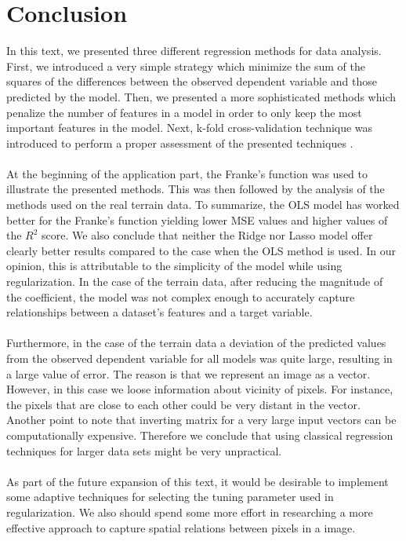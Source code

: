 \documentclass [11pt]{article}
\begin{document}
\section*{Conclusion}
In this text, we presented three different regression methods for data analysis. First, we introduced a very simple strategy which minimize the sum of the squares of the differences between the observed dependent variable and those predicted by the model. Then, we presented a more sophisticated methods which penalize the number of features in a model in order to only keep the most important features in the model. Next, k-fold cross-validation technique was introduced to perform a proper assessment of the presented techniques .\\
\\
At the beginning of the application part, the Franke's function was used to illustrate the presented methods. This was then followed by the analysis of the methods used on the real terrain data. To summarize, the OLS model has worked better for the Franke's function yielding lower MSE values and higher values of the $R^{2}$ score. We also conclude that neither the Ridge nor Lasso model offer clearly better results compared to the case when the OLS method is used. In our opinion, this is attributable to the simplicity of the model while using regularization. In the case of the terrain data, after reducing the magnitude of the coefficient, the model was not complex enough to accurately capture relationships between a dataset’s features and a target variable.  \\
\\
Furthermore, in the case of the terrain data a deviation of the predicted values from the observed dependent variable for all models was quite large, resulting in a large value of error. The reason is that we represent an image as a vector. However, in this case we loose information about vicinity of pixels. For instance, the pixels that are close to each other could be very distant in the vector. Another point to note that inverting matrix for a very large input vectors can be computationally expensive. Therefore we conclude that using classical regression techniques for larger data sets might be very unpractical.\\
\\
As part of the future expansion of this text, it would be desirable to implement some adaptive techniques for selecting the tuning parameter used in regularization. We also should spend some more effort in researching a more effective approach to capture spatial relations between pixels in a image.
\end{document}
